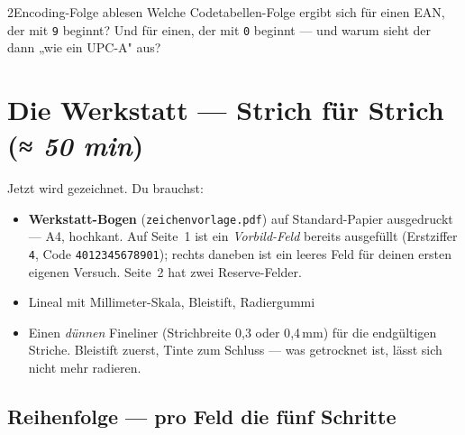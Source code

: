 \begin{bleistiftuebung}{2}{Encoding-Folge ablesen}
Welche Codetabellen-Folge ergibt sich für einen EAN, der mit
\texttt{9} beginnt? Und für einen, der mit \texttt{0} beginnt — und
warum sieht der dann „wie ein UPC-A" aus?
\end{bleistiftuebung}

\section{Die Werkstatt — Strich für Strich \normalfont(\textit{≈ 50 min})}

Jetzt wird gezeichnet. Du brauchst:

\begin{itemize}
\item \textbf{Werkstatt-Bogen} (\texttt{zeichenvorlage.pdf}) auf
  Standard-Papier ausgedruckt — A4, hochkant. Auf Seite~1 ist ein
  \emph{Vorbild-Feld} bereits ausgefüllt (Erstziffer \texttt{4},
  Code \texttt{4012345678901}); rechts daneben ist ein leeres Feld
  für deinen ersten eigenen Versuch. Seite~2 hat zwei Reserve-Felder.
\item Lineal mit Millimeter-Skala, Bleistift, Radiergummi
\item Einen \emph{dünnen} Fineliner (Strichbreite 0{,}3 oder 0{,}4\,mm)
  für die endgültigen Striche. Bleistift zuerst, Tinte zum Schluss
  — was getrocknet ist, lässt sich nicht mehr radieren.
\end{itemize}

\subsection*{Reihenfolge — pro Feld die fünf Schritte}

